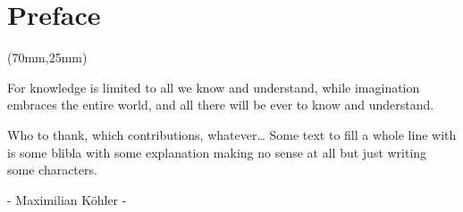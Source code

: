 
\begingroup
{}

\chapter*{Preface}

\thispagestyle{empty}

\begin{textblock*}{.7\textwidth}(70mm,25mm)
    \begin{fquote}
        For knowledge is limited to all we know and understand, while imagination embraces the entire world, and all there will be ever to know and understand.
    \end{fquote}
\end{textblock*}

Who to thank, which contributions, whatever\dots
Some text to fill a whole line with is some blibla with some explanation making no sense at all but just writing some characters.

\begin{center}
    - Maximilian Köhler -
\end{center}

\endgroup